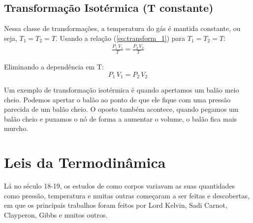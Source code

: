 \documentclass[12pt]{extarticle}
\newcommand{\<}{\langle}
\renewcommand{\>}{\rangle}
\theoremstyle{definition}
\begin{document}
\subsection{Transformação Isotérmica (T constante)}

Nessa classe de transformações, a temperatura do gás é mantida constante, ou seja, $T_1=T_2=T$. Usando a relação (\ref{eq:transform_1}) para $T_1=T_2=T$:
\begin{align*}
    \frac{P_1\,V_1}{T} = \frac{P_2\,V_2}{T}
\end{align*}

Eliminando a dependência em T:
\begin{equation}
    P_1\,V_1 = P_2\,V_2
\end{equation}

Um exemplo de transformação isotérmica é quando apertamos um balão meio cheio. Podemos apertar o balão ao ponto de que ele fique com uma pressão parecida de um balão cheio. O oposto também acontece, quando pegamos um balão cheio e puxamos o nó de forma a aumentar o volume, o balão fica mais murcho.

\section{Leis da Termodinâmica}

Lá no século 18-19, os estudos de como corpos variavam as suas quantidades como pressão, temperatura e muitas outras começaram a ser feitas e descobertas, em que os principais trabalhos foram feitos por Lord Kelvin, Sadi Carnot, Clayperon, Gibbs e muitos outros.
\end{document}

